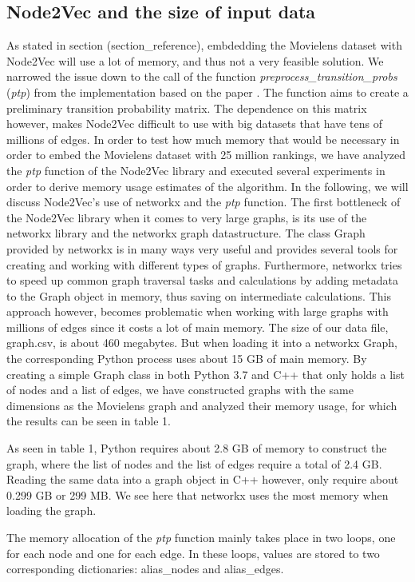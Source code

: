 \subsection{Node2Vec and the size of input data}\label{AP:N2V}
As stated in section (section\_reference), embdedding the Movielens dataset with Node2Vec will use a lot of memory, and thus not a very feasible solution. We narrowed the issue down to the call of the function  \textit{preprocess\_transition\_probs} (\textit{ptp}) from the implementation based on the paper \cite{Node2vec}. The function aims to create a preliminary transition probability matrix. The dependence on this matrix however, makes Node2Vec difficult to use with big datasets that have tens of millions of edges. In order to test how much memory that would be necessary in order to embed the Movielens dataset with 25 million rankings, we have analyzed the \textit{ptp} function of the Node2Vec library and executed several experiments in order to derive memory usage estimates of the algorithm. In the following, we will discuss Node2Vec's use of networkx and the \textit{ptp} function.
The first bottleneck of the Node2Vec library when it comes to very large graphs, is its use of the networkx library and the networkx graph datastructure. The class Graph provided by networkx is in many ways very useful and provides several tools for creating and working with different types of graphs. Furthermore, networkx tries to speed up common graph traversal tasks and calculations by adding metadata to the Graph object in memory, thus saving on intermediate calculations. This approach however, becomes problematic when working with large graphs with millions of edges since it costs a lot of main memory. The size of our data file, graph.csv, is about 460 megabytes. But when loading it into a networkx Graph, the corresponding Python process uses about 15 GB of main memory. By creating a simple Graph class in both Python 3.7 and C++ that only holds a list of nodes and a list of edges, we have constructed graphs with the same dimensions as the Movielens graph and analyzed their memory usage, for which the results can be seen in table 1.

 As seen in table 1, Python requires about 2.8 GB of memory to construct the graph, where the list of nodes and the list of edges require a total of 2.4 GB. Reading the same data into a graph object in C++ however, only require about 0.299 GB or 299 MB. We see here that networkx uses the most memory when loading the graph.

The memory allocation of the \textit{ptp} function mainly takes place in two loops, one for each node and one for each edge. In these loops, values are stored to two corresponding dictionaries: alias\_nodes and alias\_edges.
